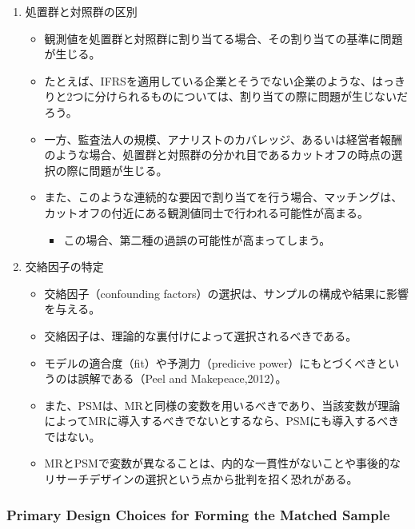 \begin{enumerate}
 \item 処置群と対照群の区別
   \begin{itemize}
    \item 観測値を処置群と対照群に割り当てる場合、その割り当ての基準に問題が生じる。
    \item たとえば、IFRSを適用している企業とそうでない企業のような、はっきりと2つに分けられるものについては、割り当ての際に問題が生じないだろう。
    \item 一方、監査法人の規模、アナリストのカバレッジ、あるいは経営者報酬のような場合、処置群と対照群の分かれ目であるカットオフの時点の選択の際に問題が生じる。
    \item また、このような連続的な要因で割り当てを行う場合、マッチングは、カットオフの付近にある観測値同士で行われる可能性が高まる。
     \begin{itemize}
     \item この場合、第二種の過誤の可能性が高まってしまう。
    \end{itemize}
   \end{itemize}
 \item 交絡因子の特定
   \begin{itemize}
    \item 交絡因子（confounding factors）の選択は、サンプルの構成や結果に影響を与える。
    \item 交絡因子は、理論的な裏付けによって選択されるべきである。
    \item モデルの適合度（fit）や予測力（predicive power）にもとづくべきというのは誤解である（Peel and Makepeace,2012）。
    \item また、PSMは、MRと同様の変数を用いるべきであり、当該変数が理論によってMRに導入するべきでないとするなら、PSMにも導入するべきではない。
    \item MRとPSMで変数が異なることは、内的な一貫性がないことや事後的なリサーチデザインの選択という点から批判を招く恐れがある。
   \end{itemize}
\end{enumerate}

\subsubsection*{Primary Design Choices for Forming the Matched Sample}


